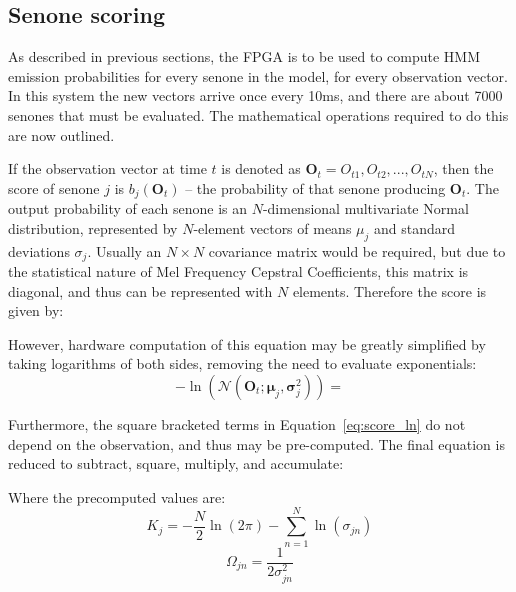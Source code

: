 	\subsection{Senone scoring} %
	\label{sub:senone_scoring}
		As described in previous sections, the FPGA is to be used to compute HMM emission probabilities for every senone in the model, for every observation vector.  In this system the new vectors arrive once every 10ms, and there are about 7000 senones that must be evaluated.  The mathematical operations required to do this are now outlined. %

		If the observation vector at time $t$ is denoted as $\textbf{O}_t = {O_{t1}, O_{t2}, ..., O_{tN}}$, then the score of senone $j$ is $b_j(\textbf{O}_t)$ -- the probability of that senone producing $\textbf{O}_t$.  The output probability of each senone is an $N$-dimensional multivariate Normal distribution, represented by $N$-element vectors of means $\mu_j$ and standard deviations $\sigma_j$.  Usually an $N\times N$ covariance matrix  would be required, but due to the statistical nature of Mel Frequency Cepstral Coefficients, this matrix is diagonal, and thus can be represented with $N$ elements.  Therefore the score is given by:

		However, hardware computation of this equation may be greatly simplified by taking logarithms of both sides, removing the need to evaluate exponentials:
		\[
		-\ln(\mathcal{N}(\textbf{O}_t; \boldsymbol{\mu}_j,\boldsymbol{\sigma}_j^2)) =
		\]

		Furthermore, the square bracketed terms in Equation~\ref{eq:score_ln} do not depend on the observation, and thus may be pre-computed.  The final equation is reduced to subtract, square, multiply, and accumulate:

		Where the precomputed values are:
		\[ K_j = - \frac{N}{2} \ln(2\pi) - \sum_{n=1}^N \ln(\sigma_{jn}) \]
		\[ \Omega_{jn} = \frac{1}{2\sigma_{jn}^2} \]

